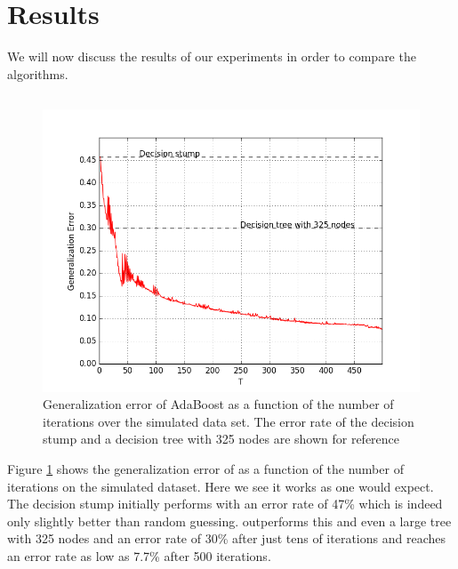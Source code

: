 \section{Results}
We will now discuss the results of our experiments in order to compare the algorithms.
\subsection{\adaB}
\label{subsec:AdaPracPerf}
\begin{figure}[!ht]
  \centering
      \includegraphics[width=\graphWidth]{generated/ADGD.png}
  \caption{Generalization error of AdaBoost as a function of the number of iterations over the simulated data set. The error rate of the decision stump and a decision tree with 325 nodes are shown for reference}
      \label{fig:adaBGD}
\end{figure}


\par Figure \ref{fig:adaBGD} shows the generalization error of \adaB as a function of the number of iterations on the simulated dataset. Here we see it works as one would expect. The decision stump initially performs with an error rate of 47\% which is indeed only slightly better than random guessing. \adaB outperforms this and even a large tree with 325 nodes and an error rate of 30\% after just tens of iterations and reaches an error rate as low as 7.7\% after 500 iterations.


